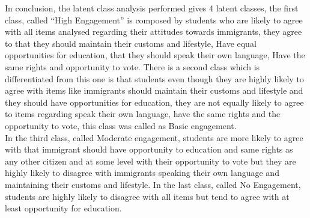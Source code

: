 \documentclass[
  12pt,
]{article}
\begin{document}
In conclusion, the latent class analysis performed gives 4 latent classes, the first class, called ``High Engagement'' is composed by students who are likely to agree with all items analysed regarding their attitudes towards immigrants, they agree to that they should maintain their customs and lifestyle, Have equal opportunities for education, that they should speak their own language, Have the same rights and opportunity to vote. There is a second class which is differentiated from this one is that students even though they are highly likely to agree with items like immigrants should maintain their customs and lifestyle and they should have opportunities for education, they are not equally likely to agree to items regarding speak their own language, have the same rights and the opportunity to vote, this class was called as Basic engagement.\\
In the third class, called Moderate engagement, students are more likely to agree with that immigrant should have opportunity to education and same rights as any other citizen and at some level with their opportunity to vote but they are highly likely to disagree with immigrants speaking their own language and maintaining their customs and lifestyle. In the last class, called No Engagement, students are highly likely to disagree with all items but tend to agree with at least opportunity for education.
\end{document}
